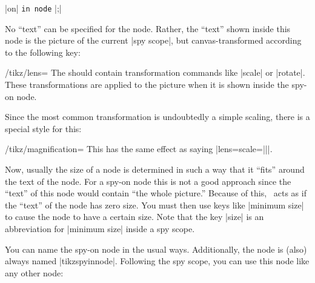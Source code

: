 \begin{command}{\spy {} |on| 
    \texttt{in node} |;|}
\begin{enumerate}
\begin{codeexample}[]
\end{codeexample}
    No ``text'' can be specified for the node. Rather, the ``text''
    shown inside this node is the picture of the current |spy scope|,
    but canvas-transformed according to the following key:
    \begin{key}{/tikz/lens=}
      The  should contain transformation commands like
      |scale| or |rotate|. These transformations are applied to the
      picture when it is shown inside the spy-on node.
    \end{key}
    Since the most common transformation is undoubtedly a simple
    scaling, there is a special style for this:
    \begin{key}{/tikz/magnification=}
      This has the same effect as saying
      |lens={scale=||}|.
    \end{key}
    Now, usually the size of a node is determined in such a way that
    it ``fits'' around the text of the node. For a spy-on node this is
    not a good approach since the ``text'' of this node would contain
    ``the whole picture.'' Because of this, \tikzname\ acts
    as if the ``text'' of the node has zero size. You must then use
    keys like |minimum size| to cause the node to have a certain
    size. Note that the key |size| is an abbreviation for
    |minimum size| inside a spy scope.

    You can name the spy-on node in the usual ways. Additionally, the
    node is (also) always named |tikzspyinnode|. Following the spy
    scope, you can use this node like any other node:
\begin{codeexample}[]
\end{codeexample}


\end{enumerate}
\end{command}

